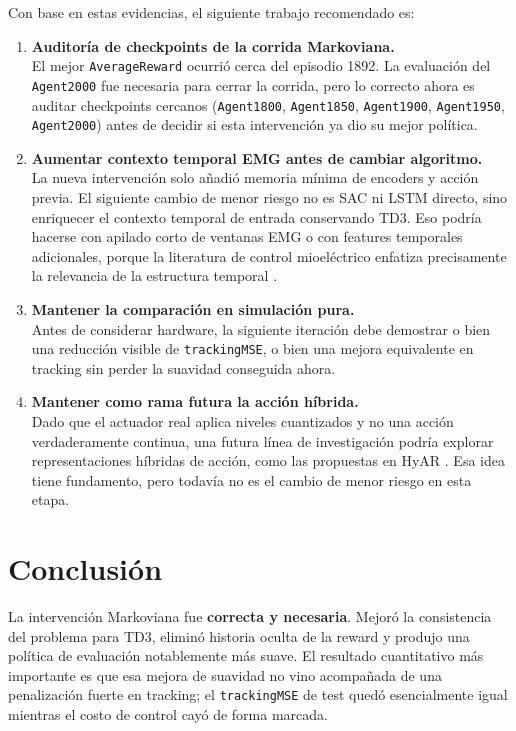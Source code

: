 \documentclass[11pt,a4paper]{article}
\begin{document}
Con base en estas evidencias, el siguiente trabajo recomendado es:
\begin{enumerate}[leftmargin=1.2cm]
    \item \textbf{Auditor\'ia de checkpoints de la corrida Markoviana.}\\
    El mejor \texttt{AverageReward} ocurri\'o cerca del episodio 1892. La evaluaci\'on del \texttt{Agent2000} fue necesaria para cerrar la corrida, pero lo correcto ahora es auditar checkpoints cercanos (\texttt{Agent1800}, \texttt{Agent1850}, \texttt{Agent1900}, \texttt{Agent1950}, \texttt{Agent2000}) antes de decidir si esta intervenci\'on ya dio su mejor pol\'itica.

    \item \textbf{Aumentar contexto temporal EMG antes de cambiar algoritmo.}\\
    La nueva intervenci\'on solo a\~nadi\'o memoria m\'inima de encoders y acci\'on previa. El siguiente cambio de menor riesgo no es SAC ni LSTM directo, sino enriquecer el contexto temporal de entrada conservando TD3. Eso podr\'ia hacerse con apilado corto de ventanas EMG o con features temporales adicionales, porque la literatura de control mioel\'ectrico enfatiza precisamente la relevancia de la estructura temporal \citep{chen2023review}.

    \item \textbf{Mantener la comparaci\'on en simulaci\'on pura.}\\
    Antes de considerar hardware, la siguiente iteraci\'on debe demostrar o bien una reducci\'on visible de \texttt{trackingMSE}, o bien una mejora equivalente en tracking sin perder la suavidad conseguida ahora.

    \item \textbf{Mantener como rama futura la acci\'on h\'ibrida.}\\
    Dado que el actuador real aplica niveles cuantizados y no una acci\'on verdaderamente continua, una futura l\'inea de investigaci\'on podr\'ia explorar representaciones h\'ibridas de acci\'on, como las propuestas en HyAR \citep{li2021hyar}. Esa idea tiene fundamento, pero todav\'ia no es el cambio de menor riesgo en esta etapa.
\end{enumerate}

\section{Conclusi\'on}

La intervenci\'on Markoviana fue \textbf{correcta y necesaria}. Mejor\'o la consistencia del problema para TD3, elimin\'o historia oculta de la reward y produjo una pol\'itica de evaluaci\'on notablemente m\'as suave. El resultado cuantitativo m\'as importante es que esa mejora de suavidad no vino acompa\~nada de una penalizaci\'on fuerte en tracking; el \texttt{trackingMSE} de test qued\'o esencialmente igual mientras el costo de control cay\'o de forma marcada.
\end{document}
